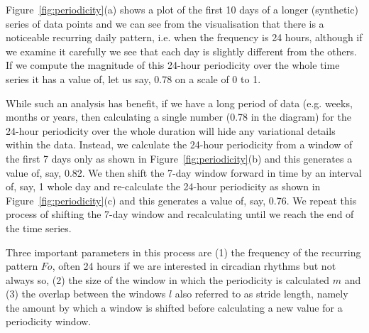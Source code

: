 \documentclass[preprints,article,accept,pdftex,moreauthors]{Definitions/mdpi}
\begin{document}
Figure~\ref{fig:periodicity}(a) shows a plot of the first 10 days of a longer (synthetic) series of data points and we can see from the visualisation that there is a noticeable  recurring daily pattern, i.e. when the frequency is 24 hours, although if we examine it carefully we see that each day is slightly different {from the others}.  If we compute the magnitude of this 24-hour periodicity over the whole time series it {has} a value of, {let us say,} 0.78 on a scale of 0 to 1.

While such an analysis has  benefit, if we have a long period of data (e.g. weeks, months or years{,} then calculating a single number (0.78 in the diagram) for the 24-hour periodicity over the whole duration will hide any variation{al} details within the {data}. Instead, we calculate the 24-hour periodicity {from} a window of the first 7 days only as shown in Figure~\ref{fig:periodicity}(b) and this generates a value of, say, 0.82. We then shift the 7-day window forward in time by {an interval of}, say, 1 whole day and re-calculate the 24-hour periodicity as shown in Figure~\ref{fig:periodicity}(c) and this generates a value of, say, 0.76.  We repeat this process {of shifting the 7-day window and recalculating} until we reach the end of the time series. 

Three important parameters in this {process} are (1) the frequency of the recurring pattern {$Fo$}, often 24 hours if we are interested in circadian rhythms but not always so, (2) the size of the window in which the periodicity is calculated $m$ and (3) the overlap between {the} windows $l$ also referred to as stride length, {namely} the amount by which a window is shifted before calculating a new value for {a } periodicity {window}.
\end{document}
